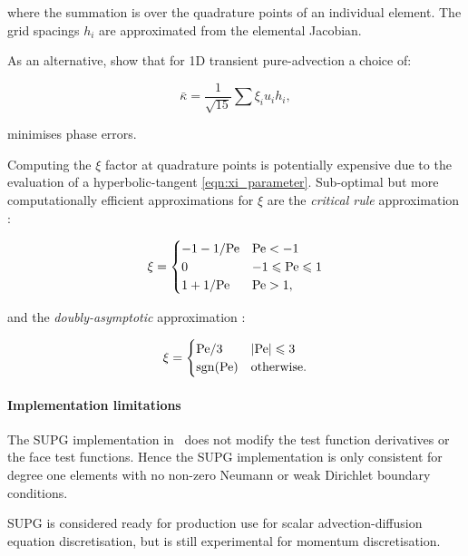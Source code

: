 where the summation is over the quadrature points of an individual element. The
grid spacings $h_i$ are approximated from the elemental Jacobian.

As an alternative, \citet{raymond1976} show that for
1D transient pure-advection a choice of:

\begin{equation}\label{eqn:md_nu_bar_transient}
  \bar{\kappa} = \frac{1}{\sqrt{15}} \sum{\xi_i u_i h_i},
\end{equation}

minimises phase errors.

Computing the $\xi$ factor at quadrature points is potentially expensive due to
the evaluation of a hyperbolic-tangent \eqref{eqn:xi_parameter}. Sub-optimal but more computationally
efficient approximations for $\xi$ are the \emph{critical rule} approximation \citep{brooks1982}:

\begin{equation}
  \xi = \begin{cases}
          -1 - 1 / \mathrm{Pe}  & \mathrm{Pe} < -1 \\
          0             & -1 \leqslant \mathrm{Pe} \leqslant 1 \\
          1 + 1 / \mathrm{Pe}   & \mathrm{Pe} > 1,
        \end{cases}
\end{equation}

and the \emph{doubly-asymptotic} approximation \citep{DoneaBook}:

\begin{equation}
  \xi = \begin{cases}
          \mathrm{Pe} / 3  & \left| \mathrm{Pe} \right| \leqslant 3 \\
          \operatorname{sgn}(\mathrm{Pe})  & \textrm{otherwise}.
        \end{cases}
\end{equation}

\paragraph{Implementation limitations}

The SUPG implementation in \fluidity\ does not modify the test function derivatives
or the face test functions. Hence the SUPG implementation is only consistent
for degree one elements with no non-zero Neumann or weak Dirichlet boundary
conditions.

SUPG is considered ready for production use for scalar advection-diffusion
equation discretisation, but is still experimental for momentum discretisation.

